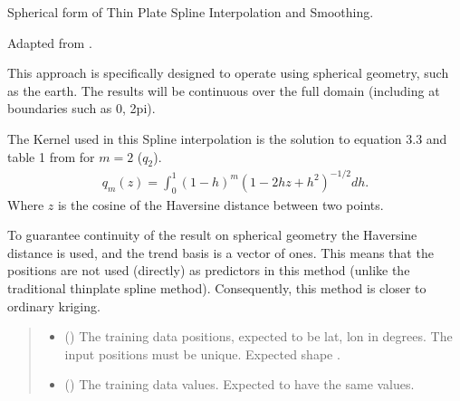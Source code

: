 \documentclass[letterpaper,10pt,english]{sphinxmanual}
\begin{document}
\begin{fulllineitems}
\label{\detokenize{splines:glomar_gridding.spline.SphericalThinPlateSpline}}
\pysigstartsignatures
\pysiglinewithargsret
{}
{\sphinxparamcomma {}\sphinxparamcomma {}}
{}
\pysigstopsignatures
\sphinxAtStartPar
Spherical form of Thin Plate Spline Interpolation and Smoothing.

\sphinxAtStartPar
Adapted from .

\sphinxAtStartPar
This approach is specifically designed to operate using spherical geometry,
such as the earth. The results will be continuous over the full domain
(including at boundaries such as 0, 2pi).

\sphinxAtStartPar
The Kernel used in this Spline interpolation is the solution to equation 3.3
and table 1 from  for \(m=2\) (\(q_2\)).
\begin{equation*}
\begin{split}q_m(z) = \int_0^1 (1-h)^m (1-2hz+h^2)^{-1/2} dh.\end{split}
\end{equation*}
\sphinxAtStartPar
Where \(z\) is the cosine of the Haversine distance between two points.

\sphinxAtStartPar
To guarantee continuity of the result on spherical geometry the Haversine
distance is used, and the trend basis is a vector of ones. This means that
the positions are not used (directly) as predictors in this method (unlike
the traditional thin\sphinxhyphen{}plate spline method). Consequently, this method is
closer to ordinary kriging.
\begin{quote}\begin{description}
\begin{itemize}
\item {}
\sphinxAtStartPar
{} () \textendash{} The training data positions, expected to be lat, lon in degrees. The
input positions must be unique. Expected shape .

\item {}
\sphinxAtStartPar
{} () \textendash{} The training data values. Expected to have the same  values.


\end{itemize}
\end{description}
\end{quote}
\end{fulllineitems}
\end{document}
